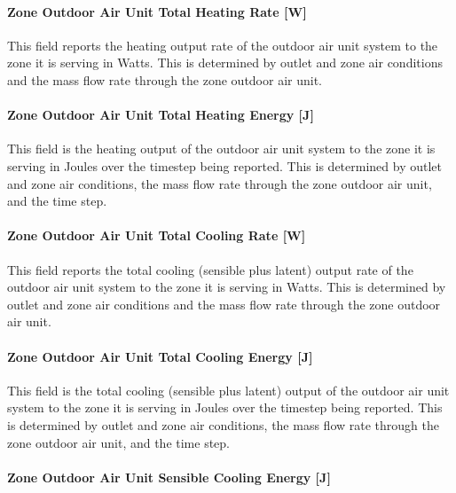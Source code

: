 \paragraph{Zone Outdoor Air Unit Total Heating Rate {[}W{]}}\label{zone-outdoor-air-unit-total-heating-rate-w}

This field reports the heating output rate of the outdoor air unit system to the zone it is serving in Watts. This is determined by outlet and zone air conditions and the mass flow rate through the zone outdoor air unit.

\paragraph{Zone Outdoor Air Unit Total Heating Energy {[}J{]}}\label{zone-outdoor-air-unit-total-heating-energy-j}

This field is the heating output of the outdoor air unit system to the zone it is serving in Joules over the timestep being reported. This is determined by outlet and zone air conditions, the mass flow rate through the zone outdoor air unit, and the time step.

\paragraph{Zone Outdoor Air Unit Total Cooling Rate {[}W{]}}\label{zone-outdoor-air-unit-total-cooling-rate-w}

This field reports the total cooling (sensible plus latent) output rate of the outdoor air unit system to the zone it is serving in Watts. This is determined by outlet and zone air conditions and the mass flow rate through the zone outdoor air unit.

\paragraph{Zone Outdoor Air Unit Total Cooling Energy {[}J{]}}\label{zone-outdoor-air-unit-total-cooling-energy-j}

This field is the total cooling (sensible plus latent) output of the outdoor air unit system to the zone it is serving in Joules over the timestep being reported. This is determined by outlet and zone air conditions, the mass flow rate through the zone outdoor air unit, and the time step.

\paragraph{Zone Outdoor Air Unit Sensible Cooling Energy {[}J{]}}\label{zone-outdoor-air-unit-sensible-cooling-energy-j}

